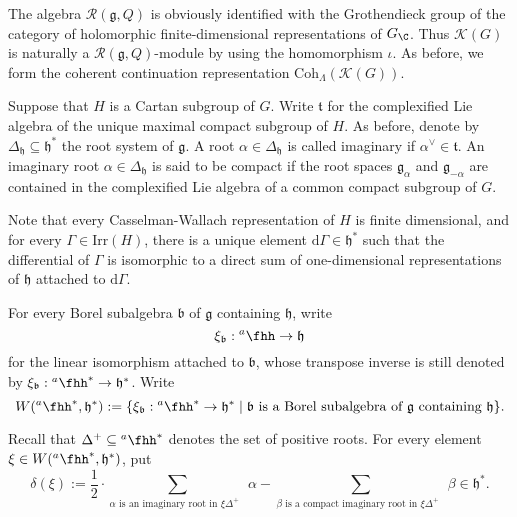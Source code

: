 \documentclass[12pt,a4paper]{amsart}
\def\subset{\subseteq}
\newcommand{\CK}{{\mathcal {K}}}
\newcommand{\g}{\mathfrak g}
\newcommand{\h}{\mathfrak h}
\renewcommand{\b}{\mathfrak b}
\renewcommand{\t}{\mathfrak t}
\newcommand{\be}{\begin {equation}}
\newcommand{\ee}{\end {equation}}
\numberwithin{equation}{section}
\theoremstyle{remark}
\def\Irr{\mathrm{Irr}}
\def\hha{{}^a\fhh}
\def\Coh{\mathrm{Coh}}
\newcommand{\Lam}{{[\lambda]}}
\begin{document}

The algebra $\mathcal R(\g, Q)$ is obviously identified with  the Grothendieck group of the category of holomorphic finite-dimensional representations of $G_\C$.  Thus $\CK(G)$ is naturally a $\mathcal R(\g, Q)$-module by using the homomorphism $\iota$. As before, we form the coherent continuation representation $\Coh_\Lambda(\CK(G))$.






 Suppose that $H$ is a  Cartan subgroup of $G$. Write $\t$ for the complexified Lie algebra of the unique maximal compact subgroup of $H$. As before, denote by $\Delta_\h\subset \h^*$ the root system of $\g$. A root $\alpha\in \Delta_\h$ is called imaginary if $\alpha^\vee\in \t$. An imaginary root $\alpha\in \Delta_\h$ is said to be compact if the root spaces $\g_\alpha$ and $\g_{-\alpha}$ are contained in  the  complexified Lie algebra of a common compact subgroup of $G$.



Note that every Casselman-Wallach representation of $H$ is finite dimensional, and for every $\Gamma\in \Irr(H)$, there is a unique element $\mathrm d \Gamma\in \h^*$ such that the differential of $\Gamma$ is isomorphic to a direct sum of  one-dimensional representations of $\h$ attached to $\mathrm d  \Gamma$.

For every Borel subalgebra $\b$ of $\g$ containing $\h$, write
\be\label{xib00}
  \xi_\b: \hha\rightarrow \h
\ee
for the linear isomorphism attached to $\b$, whose transpose inverse is still denoted by $ \xi_\b: \hha^*\rightarrow \h^*$. Write
\[
  W(\hha^*, \h^*):=\{ \xi_\b: \hha^*\rightarrow \h^*\mid \textrm{$\b$ is a Borel subalgebra of $\g$ containing $\h$}\}.
  \]

Recall that $ \Delta^+\subset \hha^*$ denotes the set of positive roots. For every element $\xi\in  W(\hha^*, \h^*)$,  put
\be\label{deltawb}
  \delta(\xi):=\frac{1}{2}\cdot \sum_{\alpha \textrm{ is an imaginary root in $\xi \Delta^+$ }} \alpha- \sum_{\beta \textrm{ is a compact imaginary root in $\xi \Delta^+$ }}\beta\in \h^*.
\ee

\end{document}
